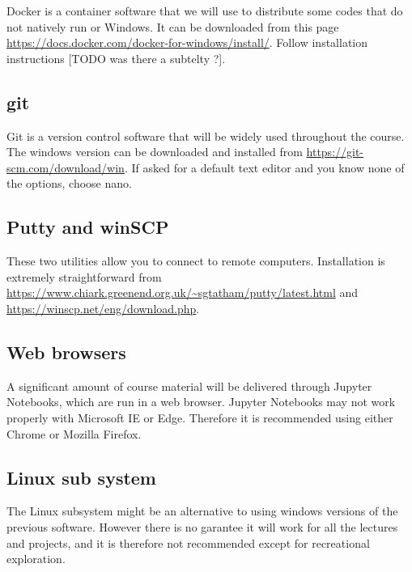 \documentclass[11pt]{article}
\begin{document}
Docker is a container software that we will use to distribute some codes that do not natively run or Windows. 
It can be downloaded from this page \url{https://docs.docker.com/docker-for-windows/install/}. 
Follow installation instructions [TODO was there a subtelty ?].

\subsection{git}

Git is a version control software that will be widely used throughout the course. 
The windows version can be downloaded and installed from \url{https://git-scm.com/download/win}. 
If asked for a default text editor and you know none of the options, choose nano.

\subsection{Putty and winSCP}

These two utilities allow you to connect to remote computers. 
Installation is extremely straightforward from 
\url{https://www.chiark.greenend.org.uk/~sgtatham/putty/latest.html} 
and \url{https://winscp.net/eng/download.php}.

\subsection{Web browsers}

A significant amount of course material will be delivered through Jupyter Notebooks, which are run in a web browser. 
Jupyter Notebooks may not work properly with Microsoft IE or Edge. 
Therefore it is recommended using either Chrome or Mozilla Firefox.  

\subsection{Linux sub system}

The Linux subsystem might be an alternative to using windows versions of the previous software. 
However there is no garantee it will work for all the lectures and projects, and it is therefore not recommended except for recreational exploration.
\end{document}
